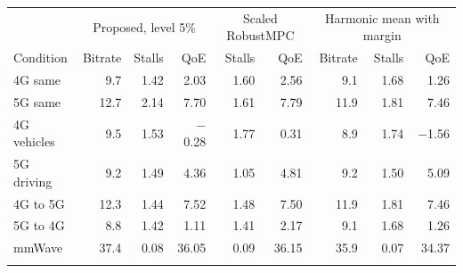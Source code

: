 \begin{tabular}{@{}lrrrrrrrr@{}}
\toprule
& \multicolumn{3}{c}{Proposed, level 5\%} & \multicolumn{2}{c}{Scaled RobustMPC} & \multicolumn{3}{c}{Harmonic mean with margin} \\
Condition & Bitrate & Stalls & QoE & Stalls & QoE & Bitrate & Stalls & QoE \\
\midrule
4G same & 9.7 & 1.42 & 2.03 & 1.60 & 2.56 & 9.1 & 1.68 & 1.26 \\
5G same & 12.7 & 2.14 & 7.70 & 1.61 & 7.79 & 11.9 & 1.81 & 7.46 \\
4G vehicles & 9.5 & 1.53 & $-$0.28 & 1.77 & 0.31 & 8.9 & 1.74 & $-$1.56 \\
5G driving & 9.2 & 1.49 & 4.36 & 1.05 & 4.81 & 9.2 & 1.50 & 5.09 \\
4G to 5G & 12.3 & 1.44 & 7.52 & 1.48 & 7.50 & 11.9 & 1.81 & 7.46 \\
5G to 4G & 8.8 & 1.42 & 1.11 & 1.41 & 2.17 & 9.1 & 1.68 & 1.26 \\
mmWave & 37.4 & 0.08 & 36.05 & 0.09 & 36.15 & 35.9 & 0.07 & 34.37 \\
\botrule
\end{tabular}
